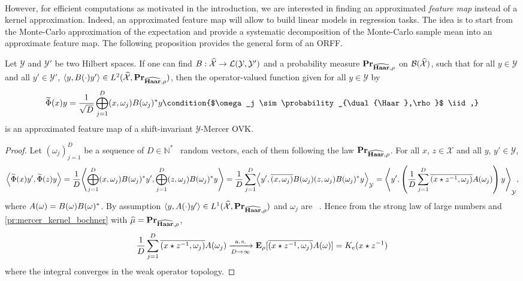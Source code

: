 \paragraph{}
However, for efficient computations as motivated in the introduction, we are interested in finding an approximated \emph{feature map} instead of a kernel approximation. Indeed, an approximated feature map will allow to build linear models in regression tasks. The idea is to start from the Monte-Carlo approximation of the expectation and provide a systematic decomposition of the Monte-Carlo sample mean into an approximate feature map. The following proposition provides the general form of an \acl{ORFF}.
\begin{proposition}[ORFF]
\label{pr:ORFF-map}
Let $\mathcal{Y}$ and $\mathcal{Y}'$ be two Hilbert spaces. If one can find $B: \widehat{\mathcal{X}} \to \mathcal{L}(\mathcal{Y},\mathcal{Y}')$ and a probability measure ${\mathbf{{Pr}}}_{\widehat{\mathbf{Haar}},\rho}$ on $\mathcal{B}(\widehat{\mathcal{X}})$, such that for all $y\in\mathcal{Y}$ and all $y'\in\mathcal{Y}'$, $\langle y, B(\cdot)y'\rangle \in L^2(\widehat{\mathcal{X}}, {\mathbf{{Pr}}}_{\widehat{\mathbf{Haar}},\rho})$, then the operator-valued function given for all $y\in\mathcal{Y}$ by
\begin{equation}
\label{eq:phitilde}
\tildePhi{\omega}(x)y= \frac{1}{\sqrt{D}}\Vect_{j=1}^D\pairing{x, \omega_j}B(\omega_j)^\adjoint y \condition{$\omega_j \sim \probability_{\dual{\Haar},\rho}$ \iid,}
\end{equation}
is an approximated feature map of a shift-invariant $\mathcal{Y}$-Mercer \acl{OVK}.
\end{proposition}
\begin{proof}
Let $(\omega_j)_{j=1}^D$ be a sequence of $D\in\mathbb{N}^*$ \iid~random vectors, each of them following the law ${\mathbf{{Pr}}}_{\widehat{\mathbf{Haar}},\rho}$. For all $x$, $z \in \mathcal{X}$ and all $y$, $y' \in \mathcal{Y}$,
\begin{dmath*}
\inner*{\tildePhi{\omega}(x)y',\tildePhi{\omega}(z)y}=\frac{1}{D}\inner*{\Vect_{j=1}^D\pairing{x, \omega_j}B(\omega_j)^\adjoint y',  \Vect_{j=1}^D\pairing{z, \omega_j}B(\omega_j)^\adjoint y}
= \frac{1}{D} \sum_{j=1}^D \inner*{y', \conj{\pairing{x, \omega_j}}B(\omega_j)\pairing{z, \omega_j}B(\omega_j)^\adjoint y}_{\mathcal{Y}}
= \inner*{y', \left(\frac{1}{D} \sum_{j=1}^D \conj{\pairing{x\groupop \inv{z}, \omega_j}}A(\omega_j)\right)y}_{\mathcal{Y}},
\end{dmath*}
where $A(\omega)=B(\omega)B(\omega)^* $. By assumption $\langle y, A(\cdot)y'\rangle\in L^1(\widehat{\mathcal{X}},{\mathbf{{Pr}}}_{\widehat{\mathbf{Haar}},\rho})$ and $\omega_j$ are \iid~. Hence from the strong law of large numbers and \cref{pr:mercer_kernel_bochner} with $\widehat{\mu}={\mathbf{{Pr}}}_{\widehat{\mathbf{Haar}},\rho}$,
\begin{dmath*}
\frac{1}{D} \sum_{j=1}^D \conj{\pairing{x\groupop\inv{z},\omega_j}}A(\omega_j)\converges{\asurely}{D\to\infty}\expectation_{\rho}[\conj{\pairing{x\groupop z^{-1},\omega_j}}A(\omega)]=K_e(x\groupop\inv{z})
\end{dmath*}
where the integral converges in the weak operator topology.
\end{proof}
